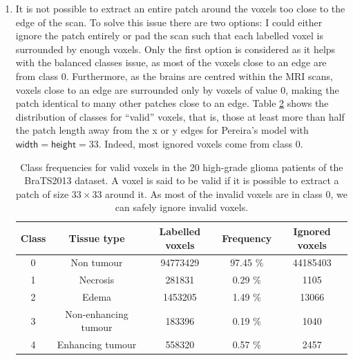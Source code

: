 \documentclass[12pt,a4paper,twoside,openright]{report}
\begin{document}
\begin{enumerate}
\begin{table}
\begin{tabular}{c c S[table-format=9.0] S[table-format=2.2]}
			\end{tabular}
			\caption[Class frequencies for the 20 high-grade glioma patients of the BraTS2013 dataset.]{Class frequencies for the 20 high-grade glioma patients of the BraTS2013 dataset. Healthy tissue voxels (class 0) are highly overrepresented, which leads to issues when training the convolutional neural network. Therefore, patches have to be balanced during the patch extraction phase.}
			\label{table:class_frequencies}
		\end{table}
	\item It is not possible to extract an entire patch around the voxels too close to the edge of the scan. To solve this issue there are two options: I could either ignore the patch entirely or pad the scan such that each labelled voxel is surrounded by enough voxels. Only the first option is considered as it helps with the balanced classes issue, as most of the voxels close to an edge are from class 0. Furthermore, as the brains are centred within the MRI scans, voxels close to an edge are surrounded only by voxels of value 0, making the patch identical to many other patches close to an edge. Table \ref{table:valid_class_frequencies} shows the distribution of classes for ``valid'' voxels, that is, those at least more than half the patch length away from the x or y edges for Pereira's model with $\textsf{width}=\textsf{height}=33$. Indeed, most ignored voxels come from class 0.

		\begin{table}[h]
		\centering	
		\begin{tabular}{c c S[table-format=9.0] S[table-format=2.2] S[table-format=8.0]}
		\textbf{Class} & \textbf{Tissue type} & \textbf{Labelled voxels} & \textbf{Frequency} & \textbf{Ignored voxels}\\
		  & Non tumour 				& 94773429 	& 97.45 \% & 44185403 \\ 
		1 & Necrosis 				& 281831 	& 0.29 \% & 1105\\ 
		2 & Edema					& 1453205 	& 1.49 \% & 13066\\ 
		3 & Non-enhancing tumour 	& 183396 	& 0.19 \% & 1040\\ 
		4 & Enhancing tumour		& 558320 	& 0.57 \% & 2457\\
		\end{tabular}
		\caption[Class frequencies for valid voxels in the 20 high-grade glioma patients of the BraTS2013 dataset.]{Class frequencies for valid voxels in the 20 high-grade glioma patients of the BraTS2013 dataset. A voxel is said to be valid if it is possible to extract a patch of size $33 \times 33$ around it. As most of the invalid voxels are in class 0, we can safely ignore invalid voxels.}
		\label{table:valid_class_frequencies}
		\end{table}
\end{enumerate}
\end{document}
